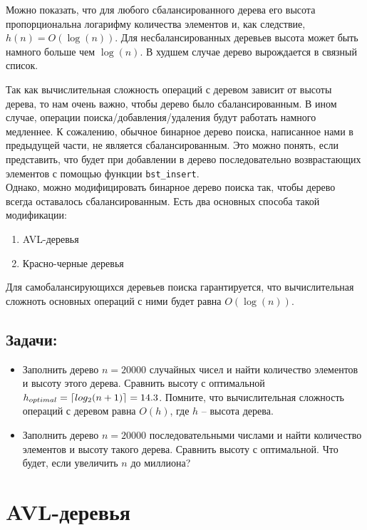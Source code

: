 \documentclass{article}
\DeclarePairedDelimiter\ceil{\lceil}{\rceil}
\begin{document}
\begin{multicols}{2}
\begin{center}
\end{center}
\end{multicols}

Можно показать, что для любого сбалансированного дерева его высота пропорциональна логарифму количества элементов и, как следствие, $h(n) = O(\log(n))$. Для несбалансированных деревьев высота может быть намного больше чем $\log(n)$. В худшем случае дерево вырождается в связный список.

Так как вычислительная сложность операций с деревом зависит от высоты дерева, то нам очень важно, чтобы дерево было сбалансированным. В ином случае, операции поиска/добавления/удаления будут работать намного медленнее. К сожалению, обычное бинарное дерево поиска, написанное нами в предыдущей части, не является сбалансированным. Это можно понять, если представить, что будет при добавлении в дерево последовательно возврастающих элементов с помощью функции \texttt{bst\_insert}.\\

Однако, можно модифицировать бинарное дерево поиска так, чтобы дерево всегда оставалось сбалансированным. Есть два основных способа такой модификации:
\begin{enumerate}
\item AVL-деревья
\item Красно-черные деревья
\end{enumerate}
Для самобалансирующихся деревьев поиска гарантируется, что вычислительная сложноть основных операций с ними будет равна $O(\log(n))$.

\subsection*{Задачи:}
\begin{itemize}
\item Заполнить дерево $n = 20000$ случайных чисел и найти количество элементов и высоту этого дерева. Сравнить высоту с оптимальной $h_{optimal} = \ceil*{log_2(n + 1)} = 14.3$. Помните, что вычислительная сложность операций с деревом равна $O(h)$, где $h$ -- высота дерева.
\item Заполнить дерево  $n = 20000$ последовательными числами и найти количество элементов и высоту такого дерева. Сравнить высоту с оптимальной. Что будет, если увеличить $n$ до миллиона?
\end{itemize}



\iffalse
\newpage
\section*{AVL-деревья}
\end{document}
